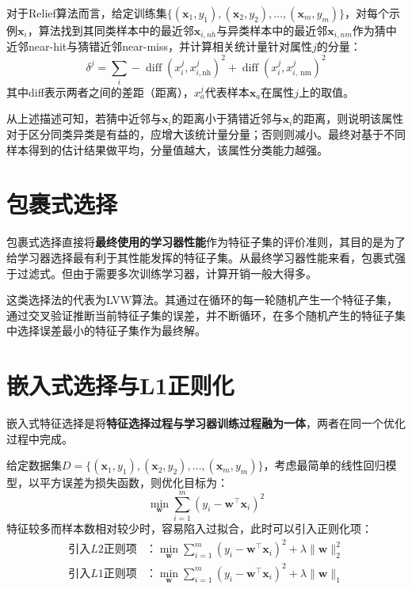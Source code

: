 对于Relief算法而言，给定训练集$\{(\boldsymbol x_1, y_1), (\boldsymbol x_2, y_2), \ldots,(\boldsymbol x_m, y_m) \}$，对每个示例$\boldsymbol x_i$，算法找到其同类样本中的最近邻$\boldsymbol x_{i,nh}$与异类样本中的最近邻$\boldsymbol x_{i,nm}$作为猜中近邻near-hit与猜错近邻near-miss，并计算相关统计量针对属性$j$的分量：
\[
\delta^{j}=\sum_{i}-\operatorname{diff}\left(x_{i}^{j}, x_{i, \mathrm{nh}}^{j}\right)^{2}+\operatorname{diff}\left(x_{i}^{j}, x_{i, \mathrm{~nm}}^{j}\right)^{2}
\]
其中diff表示两者之间的差距（距离），$x_a^j$代表样本$\boldsymbol x_a$在属性$j$上的取值。

从上述描述可知，若猜中近邻与$\boldsymbol x_i$的距离小于猜错近邻与$\boldsymbol x_i$的距离，则说明该属性对于区分同类异类是有益的，应增大该统计量分量；否则则减小。最终对基于不同样本得到的估计结果做平均，分量值越大，该属性分类能力越强。

\section{包裹式选择}\label{sec:11.3}

包裹式选择直接将\textbf{最终使用的学习器性能}作为特征子集的评价准则，其目的是为了给学习器选择最有利于其性能发挥的特征子集。从最终学习器性能来看，包裹式强于过滤式。但由于需要多次训练学习器，计算开销一般大得多。

这类选择法的代表为LVW算法。其通过在循环的每一轮随机产生一个特征子集，通过交叉验证推断当前特征子集的误差，并不断循环，在多个随机产生的特征子集中选择误差最小的特征子集作为最终解。

\section{嵌入式选择与L1正则化}\label{sec:11.4}
嵌入式特征选择是将\textbf{特征选择过程与学习器训练过程融为一体}，两者在同一个优化过程中完成。

给定数据集$D=\{ (\boldsymbol x_1, y_1),(\boldsymbol x_2, y_2), \ldots,(\boldsymbol x_m, y_m)\}$，考虑最简单的线性回归模型，以平方误差为损失函数，则优化目标为：
\[
\min _{\boldsymbol{w}} \sum_{i=1}^{m}\left(y_{i}-\boldsymbol{w}^{\top} \boldsymbol{x}_{i}\right)^{2}
\]
特征较多而样本数相对较少时，容易陷入过拟合，此时可以引入正则化项：
\[
\begin{aligned}
引入L2正则项 & ：\min _{\boldsymbol{w}} \sum_{i=1}^{m}\left(y_{i}-\boldsymbol{w}^{\top} \boldsymbol{x}_{i}\right)^{2}+\lambda\|\boldsymbol{w}\|_{2}^{2} \\
引入L1正则项 & ：\min _{\boldsymbol{w}} \sum_{i=1}^{m}\left(y_{i}-\boldsymbol{w}^{\top} \boldsymbol{x}_{i}\right)^{2}+\lambda\|\boldsymbol{w}\|_{1}
\end{aligned}
\]

